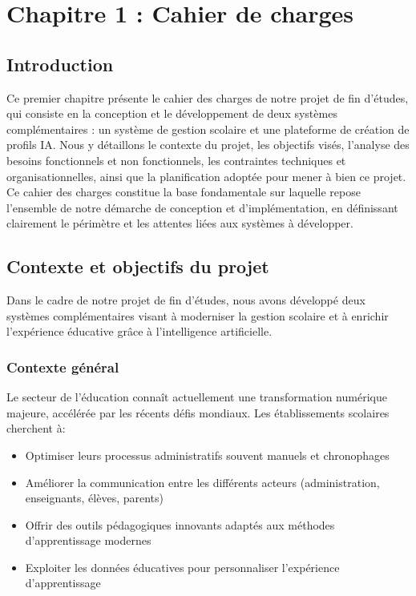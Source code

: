 \chapter*{Chapitre 1 : Cahier de charges}
\thispagestyle{fancy}
\setcounter{section}{0}
\newpage

\section{Introduction}

Ce premier chapitre présente le cahier des charges de notre projet de fin d'études, qui consiste en la conception et le développement de deux systèmes complémentaires : un système de gestion scolaire et une plateforme de création de profils IA. Nous y détaillons le contexte du projet, les objectifs visés, l'analyse des besoins fonctionnels et non fonctionnels, les contraintes techniques et organisationnelles, ainsi que la planification adoptée pour mener à bien ce projet. Ce cahier des charges constitue la base fondamentale sur laquelle repose l'ensemble de notre démarche de conception et d'implémentation, en définissant clairement le périmètre et les attentes liées aux systèmes à développer.

\section{Contexte et objectifs du projet}

Dans le cadre de notre projet de fin d'études, nous avons développé deux systèmes complémentaires visant à moderniser la gestion scolaire et à enrichir l'expérience éducative grâce à l'intelligence artificielle.

\subsection{Contexte général}

Le secteur de l'éducation connaît actuellement une transformation numérique majeure, accélérée par les récents défis mondiaux. Les établissements scolaires cherchent à:

\begin{itemize}
  \item Optimiser leurs processus administratifs souvent manuels et chronophages
  \item Améliorer la communication entre les différents acteurs (administration, enseignants, élèves, parents)
  \item Offrir des outils pédagogiques innovants adaptés aux méthodes d'apprentissage modernes
  \item Exploiter les données éducatives pour personnaliser l'expérience d'apprentissage
\end{itemize}

